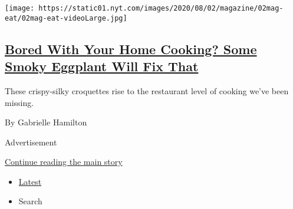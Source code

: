\begin{enumerate}
  \texttt{[image: https://static01.nyt.com/images/2020/08/02/magazine/02mag-eat/02mag-eat-videoLarge.jpg]}

  \hypertarget{bored-with-your-home-cooking-some-smoky-eggplant-will-fix-that}{%
  \subsection{\texorpdfstring{\href{/2020/07/29/magazine/bored-with-your-home-cooking-some-smoky-eggplant-will-fix-that.html}{Bored
  With Your Home Cooking? Some Smoky Eggplant Will Fix
  That}}{Bored With Your Home Cooking? Some Smoky Eggplant Will Fix That}}\label{bored-with-your-home-cooking-some-smoky-eggplant-will-fix-that}}

  These crispy-silky croquettes rise to the restaurant level of cooking
  we've been missing.

  By Gabrielle Hamilton
\end{enumerate}

Advertisement

\protect\hyperlink{after-mid1}{Continue reading the main story}

\begin{itemize}
\tightlist
\item
  \protect\hyperlink{stream-panel}{Latest}
\item
  Search
\end{itemize}

